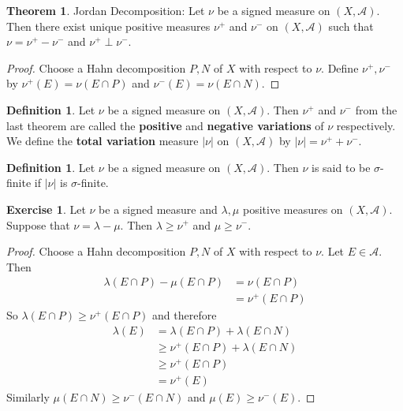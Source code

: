 \documentclass[12pt]{amsart}
\theoremstyle{definition}
\newtheorem{defn}[definition]{Definition}
\newtheorem{thm}[definition]{Theorem}
\newtheorem{ex}[definition]{Exercise}
\newcommand{\lam}{\lambda}
\newcommand{\sig}{\sigma}
\newcommand{\MA}{\mathcal{A}}
\newcommand{\lex}[1]{\label{ex:#1}}
\newcommand{\ld}[1]{\label{defn:#1}}
\begin{document}
	\begin{thm}{Jordan Decomposition:}
		Let $\nu$ be a signed measure on $(X, \MA)$. Then there exist unique positive measures $\nu^+$ and $\nu^-$ on $(X, \MA)$ such that $\nu = \nu^+ - \nu^-$ and $\nu^+ \perp \nu^-$. 
	\end{thm}
	
	\begin{proof}
		Choose a Hahn decomposition $P,N$ of $X$ with respect to $\nu$. Define $\nu^+, \nu^-$ by $\nu^+(E)= \nu(E \cap P)$ and $\nu^-(E) = \nu(E \cap N)$.
	\end{proof}
	
	\begin{defn} \ld{00000} 
		Let $\nu$ be a signed measure on $(X, \MA)$. Then $\nu^+$ and $\nu^-$ from the last theorem are called the \textbf{positive} and \textbf{negative variations} of $\nu$ respectively. We define the \textbf{total variation} measure $|\nu|$ on $(X, \MA)$ by $|\nu| = \nu^+ + \nu^-$. 
	\end{defn}
	
	\begin{defn} \ld{00000} 
		Let $\nu$ be a signed measure on $(X,\MA)$. Then $\nu$ is said to be $\sig$-finite if $|\nu|$ is $\sig$-finite.
	\end{defn}
	
	\begin{ex} \lex{00000} 
		Let $\nu$ be a signed measure and $\lam, \mu$ positive measures on $(X,\MA)$. Suppose that $\nu = \lam - \mu$. Then $\lam \geq \nu^+$ and $\mu \geq \nu^-$.
	\end{ex}
	
	\begin{proof}
		Choose a Hahn decomposition $P,N$ of $X$ with respect to $\nu$. Let $E \in \MA$. Then 
		\begin{align*}
			\lam(E \cap P) - \mu(E \cap P) 
			&= \nu(E \cap P)\\
			&= \nu^+(E \cap P)
		\end{align*}
		So $\lam(E \cap P) \geq  \nu^+(E \cap P) $ and therefore 
		\begin{align*}
			\lam(E) 
			&= \lam(E \cap P) + \lam(E \cap N)\\
			& \geq \nu^+(E \cap P) + \lam (E \cap N)\\
			& \geq \nu^+(E \cap P)\\
			& = \nu^+(E)
		\end{align*} 
		Similarly $\mu(E \cap N) \geq \nu^-(E \cap N)$ and $\mu(E) \geq \nu^-(E)$.
	\end{proof}
	
\end{document}
